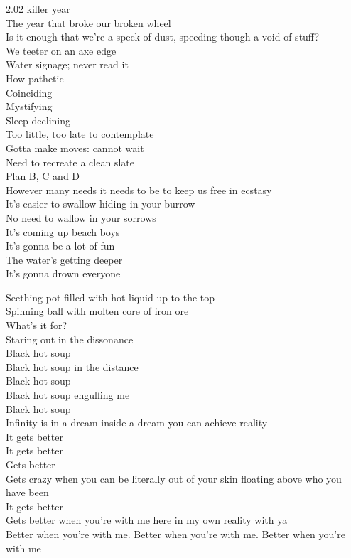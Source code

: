 2.02 killer year \\
The year that broke our broken wheel \\
Is it enough that we're a speck of dust, speeding though a void of stuff? \\
We teeter on an axe edge \\

Water signage; never read it \\
How pathetic \\
Coinciding \\
Mystifying \\
Sleep declining \\
Too little, too late to contemplate \\
Gotta make moves: cannot wait \\
Need to recreate a clean slate \\
Plan B, C and D \\
However many needs it needs to be to keep us free in ecstasy \\
It's easier to swallow hiding in your burrow \\
No need to wallow in your sorrows \\

It's coming up beach boys \\
It's gonna be a lot of fun \\
The water's getting deeper \\
It's gonna drown everyone \\




Seething pot filled with hot liquid up to the top \\
Spinning ball with molten core of iron ore \\
What's it for? \\

Staring out in the dissonance \\
Black hot soup \\
Black hot soup in the distance \\
Black hot soup \\
Black hot soup engulfing me \\
Black hot soup \\

Infinity is in a dream inside a dream you can achieve reality \\
It gets better \\
It gets better \\
Gets better \\
Gets crazy when you can be literally out of your skin floating above who you have been \\
It gets better \\
Gets better when you're with me here in my own reality with ya \\
Better when you're with me. Better when you're with me. Better when you're with me \\

